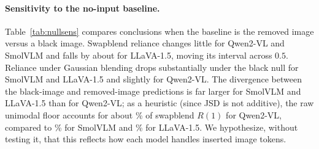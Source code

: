 \paragraph{Sensitivity to the no-input baseline.}
\label{sec:nullsens}
Table~\ref{tab:nullsens} compares conclusions when the baseline is the
removed image versus a black image. Swapblend reliance changes little for
Qwen2-VL and SmolVLM and falls by about
 for LLaVA-1.5, moving
its interval across $0.5$. Reliance under Gaussian blending drops
substantially under the black null for SmolVLM and LLaVA-1.5 and slightly
for Qwen2-VL. The divergence between the black-image and removed-image
predictions is far larger for SmolVLM and LLaVA-1.5 than for Qwen2-VL; as a
heuristic (since JSD is not additive), the raw unimodal floor accounts for
about \% of
swapblend $R(1)$ for Qwen2-VL, compared to
\% for SmolVLM and
\% for LLaVA-1.5. We
hypothesize, without testing it, that this reflects how each model handles
inserted image tokens.

